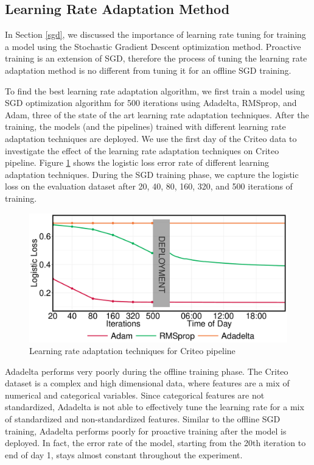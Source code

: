 \subsection{Learning Rate Adaptation Method}
In Section \ref{sgd}, we discussed the importance of learning rate tuning for training a model using the Stochastic Gradient Descent optimization method.
Proactive training is an extension of SGD, therefore the process of tuning the learning rate adaptation method is no different from tuning it for an offline SGD training.

To find the best learning rate adaptation algorithm, we first train a model using SGD optimization algorithm for 500 iterations using Adadelta, RMSprop, and Adam, three of the state of the art learning rate adaptation techniques.
After the training, the models (and the pipelines) trained with different learning rate adaptation techniques are deployed.
We use the first day of the Criteo data to investigate the effect of the learning rate adaptation techniques on Criteo pipeline.
Figure \ref{fig:criteo-learning-rate} shows the logistic loss error rate of different learning adaptation techniques. 
During the SGD training phase, we capture the logistic loss on the evaluation dataset after 20, 40, 80, 160, 320, and 500 iterations of training.


\begin{figure}[h!]
\includegraphics[width=\columnwidth]{../images/experiment-results/criteo-learning-rate-experiment.pdf}
\caption{Learning rate adaptation techniques for Criteo pipeline}
\label{fig:criteo-learning-rate}
\end{figure}

Adadelta performs very poorly during the offline training phase.
The Criteo dataset is a complex and high dimensional data, where features are a mix of numerical and categorical variables.
Since categorical features are not standardized, Adadelta is not able to effectively tune the learning rate for a mix of standardized and non-standardized features.
Similar to the offline SGD training, Adadelta performs poorly for proactive training after the model is deployed.
In fact, the error rate of the model, starting from the 20th iteration to end of day 1, stays almost constant throughout the experiment.

